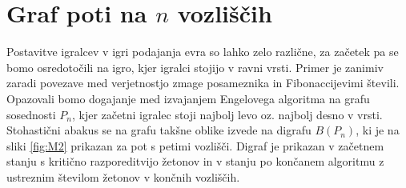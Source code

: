 \documentclass[twoside,11pt]{article}
\begin{document}
\section{Graf poti na $n$ vozliščih}

Postavitve igralcev v igri podajanja evra so lahko zelo različne, za začetek pa se bomo osredotočili na igro, kjer igralci stojijo v ravni vrsti. Primer je zanimiv zaradi povezave med verjetnostjo zmage posameznika in Fibonaccijevimi števili. 
Opazovali bomo dogajanje med izvajanjem Engelovega algoritma na grafu sosednosti $P_n$, kjer začetni igralec stoji najbolj levo oz.\,\,najbolj desno v vrsti. Stohastični abakus se na
grafu takšne oblike izvede na digrafu $B(P_{n})$, ki je na sliki \ref{fig:M2} prikazan za pot s petimi vozlišči. Digraf je prikazan v začetnem stanju s kritično razporeditvijo žetonov in v stanju po končanem algoritmu z ustreznim številom žetonov v končnih vozliščih.
\end{document}
